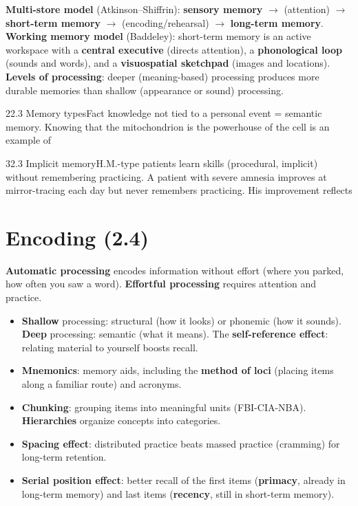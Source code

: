 \documentclass[11pt]{article}
\begin{document}
\textbf{Multi-store model} (Atkinson--Shiffrin): \textbf{sensory memory} \(\rightarrow\) (attention) \(\rightarrow\) \textbf{short-term memory} \(\rightarrow\) (encoding/rehearsal) \(\rightarrow\) \textbf{long-term memory}.
\textbf{Working memory model} (Baddeley): short-term memory is an active workspace with a \textbf{central executive} (directs attention), a \textbf{phonological loop} (sounds and words), and a \textbf{visuospatial sketchpad} (images and locations).
\textbf{Levels of processing}: deeper (meaning-based) processing produces more durable memories than shallow (appearance or sound) processing.

\begin{q}{2}{2.3 Memory types}{Fact knowledge not tied to a personal event = semantic memory.}
Knowing that the mitochondrion is the powerhouse of the cell is an example of
\end{q}

\begin{q}{3}{2.3 Implicit memory}{H.M.-type patients learn skills (procedural, implicit) without remembering practicing.}
A patient with severe amnesia improves at mirror-tracing each day but never remembers practicing. His improvement reflects
\end{q}

\section{Encoding (2.4)}

\textbf{Automatic processing} encodes information without effort (where you parked, how often you saw a word). \textbf{Effortful processing} requires attention and practice.
\begin{itemize}
\item \textbf{Shallow} processing: structural (how it looks) or phonemic (how it sounds). \textbf{Deep} processing: semantic (what it means). The \textbf{self-reference effect}: relating material to yourself boosts recall.
\item \textbf{Mnemonics}: memory aids, including the \textbf{method of loci} (placing items along a familiar route) and acronyms.
\item \textbf{Chunking}: grouping items into meaningful units (FBI-CIA-NBA). \textbf{Hierarchies} organize concepts into categories.
\item \textbf{Spacing effect}: distributed practice beats massed practice (cramming) for long-term retention.
\item \textbf{Serial position effect}: better recall of the first items (\textbf{primacy}, already in long-term memory) and last items (\textbf{recency}, still in short-term memory).
\end{itemize}
\end{document}
